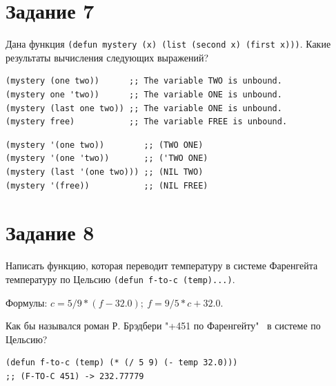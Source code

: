 \documentclass[a4paper,14pt, unknownkeysallowed]{extreport}
\begin{document}
\section{Задание 7}

Дана функция \texttt{(defun mystery (x) (list (second x) (first x)))}. Какие результаты вычисления следующих выражений?

\begin{center}
\captionsetup{justification=raggedright,singlelinecheck=off}
\begin{lstlisting}[label=lst:parallel_processing,caption=Решение задания 7]
(mystery (one two))      ;; The variable TWO is unbound. 
(mystery one 'two))      ;; The variable ONE is unbound.
(mystery (last one two)) ;; The variable ONE is unbound.
(mystery free)           ;; The variable FREE is unbound.	
\end{lstlisting}
\end{center}

\begin{center}
\captionsetup{justification=raggedright,singlelinecheck=off}
\begin{lstlisting}[label=lst:parallel_processing,caption=Варианты следующих выражений с устраненными ошибками]
(mystery '(one two))        ;; (TWO ONE) 
(mystery '(one 'two))       ;; ('TWO ONE) 
(mystery (last '(one two))) ;; (NIL TWO)
(mystery '(free))           ;; (NIL FREE)
\end{lstlisting}
\end{center}

\section{Задание 8}

Написать функцию, которая переводит температуру в системе Фаренгейта температуру по Цельсию \texttt{(defun f-to-c (temp)...)}.

Формулы: $c = 5/9*(f-32.0); \ f= 9/5*c+32.0$.

Как бы назывался роман Р. Брэдбери "+451 по Фаренгейту" \ в системе по Цельсию?

\begin{center}
\captionsetup{justification=raggedright,singlelinecheck=off}
\begin{lstlisting}[label=lst:parallel_processing,caption=Решение задания 8]
(defun f-to-c (temp) (* (/ 5 9) (- temp 32.0)))
;; (F-TO-C 451) -> 232.77779
\end{lstlisting}
\end{center}
\end{document}
